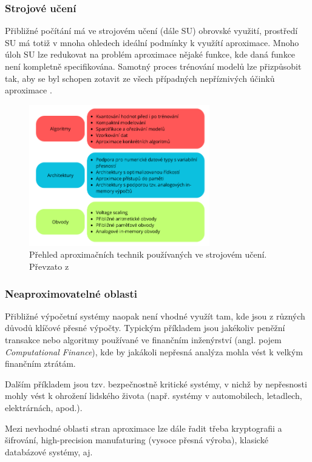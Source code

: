 \subsubsection{Strojové učení}
Přibližné počítání má ve strojovém učení (dále SU) obrovské využití, prostředí SU má totiž v mnoha ohledech ideální podmínky k využítí aproximace. Mnoho úloh SU lze redukovat na problém aproximace nějaké funkce, kde daná funkce není kompletně specifikována. Samotný proces trénování modelů lze přizpůsobit tak, aby se byl schopen zotavit ze všech případných nepříznivých účinků aproximace \cite{approx_ai}.

\begin{figure}[H]
    \centering
    \includegraphics[width=0.7\textwidth]{obrazky-figures/ml.png}
    \caption{Přehled aproximačních technik používaných ve strojovém učení. Převzato z \cite{approx_ai}}
    \label{fig:enter-label}
\end{figure}

\subsubsection{Neaproximovatelné oblasti}
Přibližné výpočetní systémy naopak není vhodné využít tam, kde jsou z různých důvodů klíčové přesné výpočty. Typickým příkladem jsou jakékoliv peněžní transakce nebo algoritmy používané ve finančním inženýrství (angl. pojem \textit{Computational Finance}), kde by jakákoli nepřesná analýza mohla vést k velkým finančním ztrátám.

Dalším příkladem jsou tzv. bezpečnostně kritické systémy, v nichž by nepřesnosti mohly vést k ohrožení lidského života (např. systémy v automobilech, letadlech, elektrárnách, apod.).

Mezi nevhodné oblasti stran aproximace lze dále řadit třeba kryptografii a šifrování, high-precision manufaturing (vysoce přesná výroba), klasické databázové systémy, aj.

